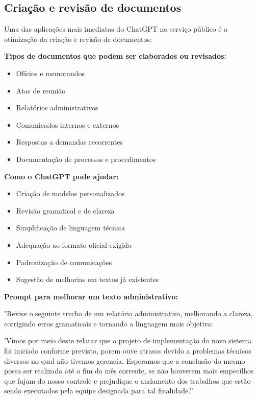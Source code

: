 \documentclass[12pt,a4paper]{book}
\begin{document}
\subsection{Criação e revisão de documentos}

Uma das aplicações mais imediatas do ChatGPT no serviço público é a otimização da criação e revisão de documentos:

\textbf{Tipos de documentos que podem ser elaborados ou revisados:}
\begin{itemize}
    \item Ofícios e memorandos
    \item Atas de reunião
    \item Relatórios administrativos
    \item Comunicados internos e externos
    \item Respostas a demandas recorrentes
    \item Documentação de processos e procedimentos
\end{itemize}

\textbf{Como o ChatGPT pode ajudar:}
\begin{itemize}
    \item Criação de modelos personalizados
    \item Revisão gramatical e de clareza
    \item Simplificação de linguagem técnica
    \item Adequação ao formato oficial exigido
    \item Padronização de comunicações
    \item Sugestão de melhorias em textos já existentes
\end{itemize}

\begin{tcolorbox}[exemplo]
\textbf{Prompt para melhorar um texto administrativo:}

"Revise o seguinte trecho de um relatório administrativo, melhorando a clareza, corrigindo erros gramaticais e tornando a linguagem mais objetiva:

'Vimos por meio deste relatar que o projeto de implementação do novo sistema foi iniciado conforme previsto, porem ouve atrasos devido a problemas técnicos diversos no qual não tivemos gerencia. Esperamos que a conclusão do mesmo possa ser realizada até o fim do mês corrente, se não houverem mais empecilhos que fujam do nosso controle e prejudique o andamento dos trabalhos que estão sendo executados pela equipe designada para tal finalidade.'"
\end{tcolorbox}
\end{document}
